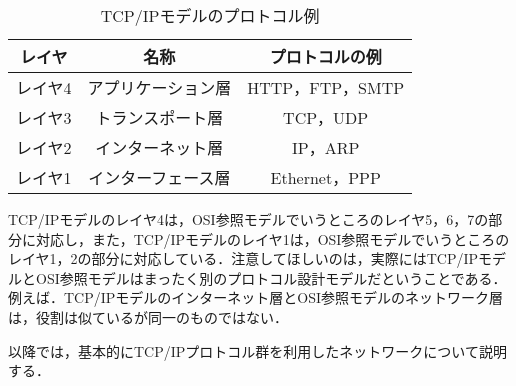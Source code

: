 	\begin{table}[htb]
		\begin{center}
			\caption{TCP/IPモデルのプロトコル例}
			\begin{tabular}{|c|c|c|} \hline
				レイヤ & 名称 & プロトコルの例 \\ \hline
				レイヤ4 & アプリケーション層 & HTTP，FTP，SMTP \\
				レイヤ3 & トランスポート層 & TCP，UDP \\
				レイヤ2 & インターネット層 & IP，ARP \\
				レイヤ1 & インターフェース層 & Ethernet，PPP \\ \hline
			\end{tabular}
			\label{tab:tcp}
		\end{center}
	\end{table}
	
	TCP/IPモデルのレイヤ4は，OSI参照モデルでいうところのレイヤ5，6，7の部分に対応し，また，TCP/IPモデルのレイヤ1は，OSI参照モデルでいうところのレイヤ1，2の部分に対応している．注意してほしいのは，実際にはTCP/IPモデルとOSI参照モデルはまったく別のプロトコル設計モデルだということである．例えば．TCP/IPモデルのインターネット層とOSI参照モデルのネットワーク層は，役割は似ているが同一のものではない．
	
	以降では，基本的にTCP/IPプロトコル群を利用したネットワークについて説明する．
	
	
	